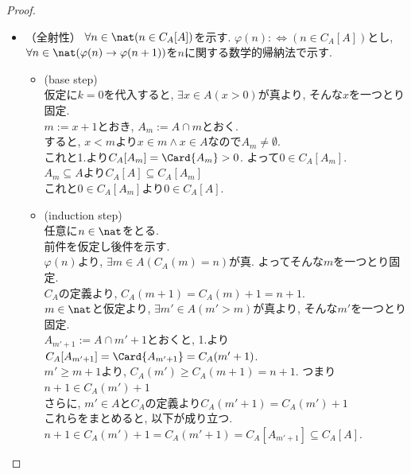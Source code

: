 \begin{proof}
\begin{itemize}
    \item[]\hspace{-0.5cm} （全射性）
        $\forall n \in \nat (n \in C_A[A])$を示す.
        $\varphi (n) :\Leftrightarrow (n \in C_A[A])$とし,
        $\forall n \in \nat (\varphi (n) \rightarrow \varphi (n+1))$を$n$に関する数学的帰納法で示す.
        \begin{itemize}
            \item[]\hspace{-0.5cm} (base step) \\
                仮定に$k=0$を代入すると,
                $\exists x \in A(x > 0)$が真より,
                そんな$x$を一つとり固定.\\
                $m := x + 1$とおき,
                $A_m := A \cap m$とおく.\\
                すると,
                $x < m$より$x \in m \land x \in A$なので$A_m \neq \emptyset$.\\
                これと1.より$C_A[A_m] = \Card{A_m} > 0$.
                よって$0 \in C_A[A_m].$\\
                $A_m \subseteq A$より$C_A[A] \subseteq C_A[A_m]$\\
                これと$0 \in C_A[A_m]$より$0 \in C_A[A]$.
            \item[]\hspace{-0.5cm} (induction step) \\
                任意に$n\in \nat$をとる.\\
                前件を仮定し後件を示す.\\
                $\varphi (n)$より,
                $\exists m \in A (C_A(m) = n)$が真.
                よってそんな$m$を一つとり固定.\\
                $C_A$の定義より,
                $C_A(m+1) = C_A(m) +1 = n+1$.\\
                $m \in \nat$と仮定より,
                $\exists m' \in A(m' > m)$が真より,
                そんな$m'$を一つとり固定.\\
                $A_{m'+1} := A \cap m'+1$とおくと,
                1.より$C_A[A_{m'+1}] = \Card{A_{m'+1}} = C_A(m'+1)$.\\
                $m' \geq m+1$より,
                $C_A(m') \geq C_A(m+1) = n+1$.
                つまり$n+1 \in C_A(m') + 1$\\
                さらに,
                $m' \in A$と$C_A$の定義より$C_A(m'+1) = C_A(m') + 1$\\
                これらをまとめると,
                以下が成り立つ.\\
                $n+1 \in  C_A(m') + 1 = C_A(m' + 1) = C_A[A_{m'+1}] \subseteq C_A[A]$. \qedhere
        \end{itemize}
\end{itemize}

\end{proof}
